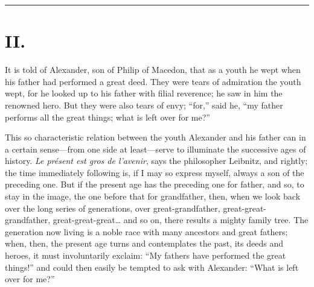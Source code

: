 \documentclass[12pt]{book}
\newcommand{\opage}[1]{\marginnote{\footnotesize\textit{[#1]}}}
\begin{document}
\begin{center}\rule{3cm}{0.4pt}\end{center}

\chapter*{II.}
\label{ch:ii}
\opage{17}\setcounter{footnote}{0}%
It is told of Alexander, son of Philip of Macedon, that as a youth he
wept when his father had performed a great deed. They were tears of
admiration the youth wept, for he looked up to his father with filial
reverence; he saw in him the renowned hero. But they were also tears of
envy; ``for,'' said he, ``my father performs all the great things; what
is left over for me?''

This so characteristic relation between the youth Alexander and his
father can in a certain sense---from one side at least---serve to
illuminate the successive ages of history. \textit{Le présent est gros
de l'avenir}, says the philosopher Leibnitz, and rightly; the time
immediately following is, if I may so express myself, always a son of
the preceding one. But if the present age has the preceding one for
father, and so, to stay in the image, the one before that for
grandfather, then, when we look back over the long series of
generations, over great-grandfather, great-great-grandfather,
great-great-great\ldots{} and so on, there results a mighty family tree.
The generation now living is a noble race with many ancestors and great
fathers; when, then, the present age turns and contemplates the past,
its deeds and heroes, it must involuntarily exclaim: ``My
\opage{18}\setcounter{footnote}{0}%
fathers have performed the great things!'' and could then easily be
tempted to ask with Alexander: ``What is left over for me?''
\end{document}
